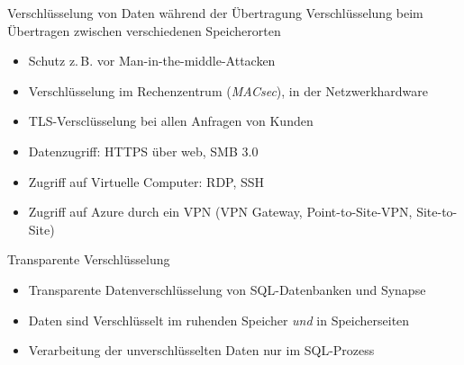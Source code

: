 \begin{flashcard}[Definition]{Verschlüsselung von Daten während der Übertragung}
  Verschlüsselung beim Übertragen zwischen verschiedenen Speicherorten
  \begin{itemize}
    \item Schutz z.\,B. vor Man-in-the-middle-Attacken
    \item Verschlüsselung im Rechenzentrum (\emph{MACsec}), in der Netzwerkhardware
    \item TLS-Versclüsselung bei allen Anfragen von Kunden
    \item Datenzugriff: HTTPS über web, SMB 3.0
    \item Zugriff auf Virtuelle Computer: RDP, SSH
    \item Zugriff auf Azure durch ein VPN (VPN Gateway, Point-to-Site-VPN, Site-to-Site)
  \end{itemize}
\end{flashcard}

\begin{flashcard}[Definition]{Transparente Verschlüsselung}
  \begin{itemize}
    \item Transparente Datenverschlüsselung von SQL-Datenbanken und Synapse
    \item Daten sind Verschlüsselt im ruhenden Speicher \emph{und} in Speicherseiten
    \item Verarbeitung der unverschlüsselten Daten nur im SQL-Prozess
  \end{itemize}
\end{flashcard}

